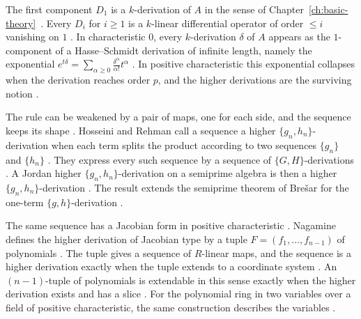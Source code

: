 The first component $D_1$ is a $k$-derivation of $A$ in the sense of
Chapter~\ref{ch:basic-theory}~\cite[p.~2]{NarvaezMacarro2020}. Every $D_i$ for $i\geq 1$ is a $k$-linear
differential operator of order $\leq i$ vanishing on $1$
\cite[p.~1]{NarvaezMacarro2020}. In characteristic $0$, every $k$-derivation
$\delta$ of $A$ appears as the $1$-component of a Hasse--Schmidt derivation of
infinite length, namely the exponential $e^{t\delta}=\sum_{\alpha\geq0}
\frac{\delta^\alpha}{\alpha!}t^\alpha$ \cite[p.~2]{NarvaezMacarro2020}. In
positive characteristic this exponential collapses when the derivation reaches
order $p$, and the higher derivations are the surviving notion
\cite[p.~2]{NarvaezMacarro2020}.

The rule can be weakened by a pair of maps, one for each side, and the sequence
keeps its shape \cite[Definition~2.1, p.~3]{HosseiniRehman2019Higher}. Hosseini
and Rehman call a sequence a higher
$\{g_n,h_n\}$-derivation when each term splits the product according to two
sequences $\{g_n\}$ and $\{h_n\}$ \cite[Definition~2.1, p.~3]{HosseiniRehman2019Higher}.
They express every such sequence by a sequence of $\{G,H\}$-derivations
\cite[Theorem~2.4, p.~7]{HosseiniRehman2019Higher}. A Jordan higher
$\{g_n,h_n\}$-derivation on a semiprime algebra is then a higher
$\{g_n,h_n\}$-derivation \cite[Corollary~2.6, p.~12]{HosseiniRehman2019Higher}.
The result extends the semiprime theorem of Brešar for the one-term
$\{g,h\}$-derivation \cite[p.~1]{HosseiniRehman2019Higher}.

The same sequence has a Jacobian form in positive characteristic
\cite[p.~1]{Nagamine2019HigherJacobian}. Nagamine defines the higher
derivation of Jacobian type by a tuple $F=(f_1,\dots,f_{n-1})$ of polynomials
\cite[Definition~2.4, p.~3]{Nagamine2019HigherJacobian}. The tuple gives a
sequence of $R$-linear maps, and the sequence is a higher derivation exactly
when the tuple extends to a coordinate system \cite[Definition~2.4,
p.~3]{Nagamine2019HigherJacobian}. An $(n-1)$-tuple of polynomials is
extendable in this sense exactly when the higher derivation exists and has a
slice \cite[Theorem~2.8, p.~5]{Nagamine2019HigherJacobian}. For the polynomial
ring in two variables over a field of positive characteristic, the same
construction describes the variables \cite[Theorem~3.1,
p.~6]{Nagamine2019HigherJacobian}.


